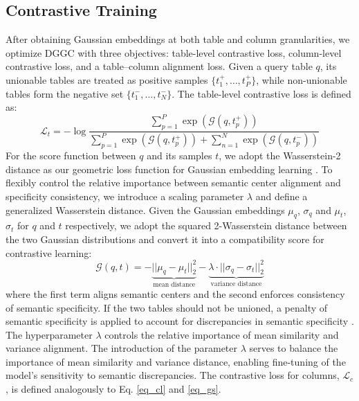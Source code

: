 \subsection{Contrastive Training}
\label{sub_sec_gau}
After obtaining Gaussian embeddings at both table and column granularities, we optimize DGGC with three objectives: table-level contrastive loss, column-level contrastive loss, and a table–column alignment loss. Given a query table \(q\), its unionable tables are treated as positive samples \(\{t_1^+, \dots, t_P^+\}\), while non-unionable tables form the negative set \(\{t_1^-, \dots, t_N^-\}\). The table-level contrastive loss is defined as:
\begin{equation}
\label{eq_cl}
    \mathcal{L}_t=-\log\frac{\sum_{p=1}^P\exp(\mathcal{G}(q,t_p^+))}{\sum_{p=1}^P\exp(\mathcal{G}(q,t_p^+))+\sum_{n=1}^N\exp(\mathcal{G}(q,t_p^-))}    
\end{equation}
For the score function between $q$ and its samples $t$, we adopt the Wasserstein-2 distance as our geometric loss function for Gaussian embedding learning \cite{muzellec2018generalizing}. To flexibly control the relative importance between semantic center alignment and specificity consistency, we introduce a scaling parameter $\lambda$ and define a generalized Wasserstein distance. Given the Gaussian embeddings $\mu_q$, $\sigma_q$ and $\mu_t$, $\sigma_t$ for $q$ and $t$ respectively, we adopt the squared 2-Wasserstein distance between the two Gaussian distributions and convert it into a compatibility score for contrastive learning:
\begin{equation}
\label{eq_gs}
    \mathcal{G}(q,t)=-
    \underbrace{{||\mu_q-\mu_t||_2^2}}_{\text{mean distance}}-\underbrace{\lambda\cdot||\sigma_q-\sigma_t||_2^2}_{\text{variance distance}} 
\end{equation}
where the first term aligns semantic centers and the second enforces consistency of semantic specificity. If the two tables should not be unioned, a penalty of semantic specificity is applied to account for discrepancies in semantic specificity {\cite{vilnis2014word}}. 
The hyperparameter \(\lambda\) controls the relative importance of mean similarity and variance alignment. The introduction of the parameter $\lambda$ serves to balance the importance of mean similarity and variance distance, enabling fine-tuning of the model's sensitivity to semantic discrepancies. The contrastive loss for columns, $\mathcal{L}_c$, is defined analogously to Eq. \eqref{eq_cl} and \eqref{eq_gs}.

